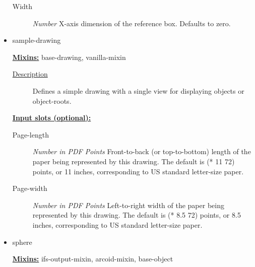 \documentclass [11pt]{book}
\begin{document}
\begin{itemize}
\begin{description}
\item [Width]
\emph{Number} X-axis dimension of the reference box. Defaults to zero.


\end{description}







\item {}sample-drawing


\textbf{
\underline{Mixins:}} base-drawing, vanilla-mixin





\begin{description}

\item [
\underline{Description}]


Defines a simple drawing with a single view for displaying objects or object-roots.



\end{description}








\textbf{
\underline{Input slots (optional):}}

\begin{description}

\item [Page-length]
\emph{Number in PDF Points} Front-to-back (or top-to-bottom) length of the paper being represented
by this drawing. The default is (* 11 72) points, or 11 inches, corresponding to US standard
letter-size paper.


\item [Page-width]
\emph{Number in PDF Points} Left-to-right width of the paper being represented by this drawing.
The default is (* 8.5 72) points, or 8.5 inches, corresponding to US standard letter-size paper.


\end{description}







\item {}sphere


\textbf{
\underline{Mixins:}} ifs-output-mixin, arcoid-mixin, base-object






\end{itemize}
\end{document}
